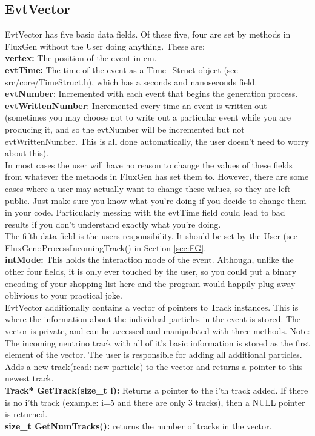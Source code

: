 \documentclass[12pt]{article}
\begin{document}
\subsection{EvtVector}
EvtVector has five basic data fields.  Of these five, four are set by methods in FluxGen without the User doing anything.  These are:\\
\textbf{vertex:} The position of the event in cm.\\
\textbf{evtTime:} The time of the event as a Time\_Struct object (see src/core/TimeStruct.h), which has a seconds and nanoseconds field.\\
\textbf{evtNumber}: Incremented with each event that begins the generation process.\\
 \textbf{evtWrittenNumber}: Incremented every time an event is written out (sometimes you may choose not to write out a particular event while you are producing it, and so the evtNumber will be incremented but not evtWrittenNumber.  This is all done automatically, the user doesn't need to worry about this).\\  
In most cases the user will have no reason to change the values of these fields from whatever the methods in FluxGen has set them to.  However, there are some cases where a user may actually want to change these values, so they are left public.  Just make sure you know what you're doing if you decide to change them in your code.  Particularly messing with the evtTime field could lead to bad results if you don't understand exactly what you're doing.\\
The fifth data field is the users responsibility.  It should be set by the User (see FluxGen::ProcessIncomingTrack() in Section \ref{sec:FG}.\\
\textbf{intMode:} This holds the interaction mode of the event.  Although, unlike the other four fields, it is only ever touched by the user, so you could put a binary encoding of your shopping list here and the program would happily plug away oblivious to your practical joke.\\ 
EvtVector additionally contains a vector of pointers to Track instances.  This is where the information about the individual particles in the event is stored.  The vector is private, and can be accessed and manipulated with three methods.  Note: The incoming neutrino track with all of it's basic information is stored as the first element of the vector.  The user is responsible for adding all additional particles.\\
 Adds a new track(read: new particle) to the vector and returns a pointer to this newest track.\\
\textbf{Track* GetTrack(size_t i):} Returns a pointer to the i'th track added.  If there is no i'th track (example: i=5 and there are only 3 tracks), then a NULL pointer is returned.\\
\textbf{size_t GetNumTracks():} returns the number of tracks in the vector.
\end{document}
